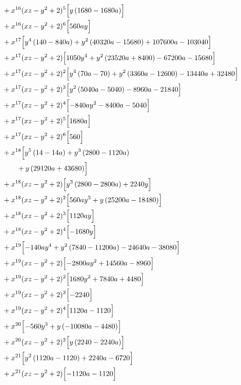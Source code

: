 \begin{align*}
&{}+x^{16}(xz-y^2+2)^{5}\Bigl[y \left(1680 - 1680 a\right)\Bigr]\\
&{}+x^{16}(xz-y^2+2)^{6}\Bigl[560 a y\Bigr]\\
&{}+x^{17}\Bigl[y^{4} \left(140 - 840 a\right) + y^{2} \left(40320 a - 15680\right) + 107600 a - 103040\Bigr]\\
&{}+x^{17}(xz-y^2+2)\Bigl[1050 y^{4} + y^{2} \left(23520 a + 8400\right) - 67200 a - 15680\Bigr]\\
&{}+x^{17}(xz-y^2+2)^{2}\Bigl[y^{4} \left(70 a - 70\right) + y^{2} \left(3360 a - 12600\right) - 13440 a + 32480\Bigr]\\
&{}+x^{17}(xz-y^2+2)^{3}\Bigl[y^{2} \left(5040 a - 5040\right) - 8960 a - 21840\Bigr]\\
&{}+x^{17}(xz-y^2+2)^{4}\Bigl[- 840 a y^{2} - 8400 a - 5040\Bigr]\\
&{}+x^{17}(xz-y^2+2)^{5}\Bigl[1680 a\Bigr]\\
&{}+x^{17}(xz-y^2+2)^{6}\Bigl[560\Bigr]\\
&{}+x^{18}\Bigl[y^{5} \left(14 - 14 a\right) + y^{3} \left(2800 - 1120 a\right)\\
&\qquad + y \left(29120 a + 43680\right)\Bigr]\\
&{}+x^{18}(xz-y^2+2)\Bigl[y^{3} \left(2800 - 2800 a\right) + 2240 y\Bigr]\\
&{}+x^{18}(xz-y^2+2)^{2}\Bigl[560 a y^{3} + y \left(25200 a - 18480\right)\Bigr]\\
&{}+x^{18}(xz-y^2+2)^{3}\Bigl[1120 a y\Bigr]\\
&{}+x^{18}(xz-y^2+2)^{4}\Bigl[- 1680 y\Bigr]\\
&{}+x^{19}\Bigl[- 140 a y^{4} + y^{2} \left(7840 - 11200 a\right) - 24640 a - 38080\Bigr]\\
&{}+x^{19}(xz-y^2+2)\Bigl[- 2800 a y^{2} + 14560 a - 8960\Bigr]\\
&{}+x^{19}(xz-y^2+2)^{2}\Bigl[1680 y^{2} + 7840 a + 4480\Bigr]\\
&{}+x^{19}(xz-y^2+2)^{3}\Bigl[- 2240\Bigr]\\
&{}+x^{19}(xz-y^2+2)^{4}\Bigl[1120 a - 1120\Bigr]\\
&{}+x^{20}\Bigl[- 560 y^{3} + y \left(- 10080 a - 4480\right)\Bigr]\\
&{}+x^{20}(xz-y^2+2)^{2}\Bigl[y \left(2240 - 2240 a\right)\Bigr]\\
&{}+x^{21}\Bigl[y^{2} \left(1120 a - 1120\right) + 2240 a - 6720\Bigr]\\
&{}+x^{21}(xz-y^2+2)\Bigl[- 1120 a - 1120\Bigr]\\

\end{align*}
